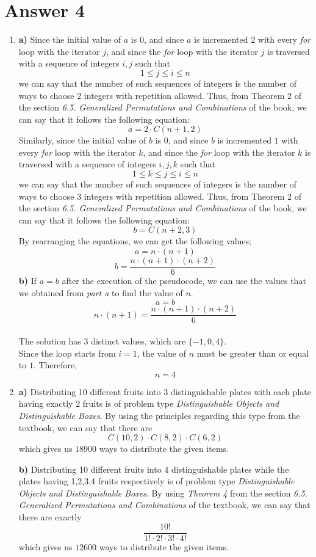 \documentclass[12pt]{article}
\begin{document}
\section*{Answer 4}
\begin{enumerate}
\item
\textbf{a)} Since the initial value of $a$ is $0$, and since $a$ is incremented $2$ with every \textit{for} loop with the iterator $j$, and since the \textit{for} loop with the iterator $j$ is traversed with a sequence of integers $i, j$ such that $$ 1 \leq j \leq i \leq n $$
we can say that the number of such sequences of integers is the number of ways to choose $2$ integers with repetition allowed. Thus, from Theorem 2 of the section \textit{6.5. Generalized Permutations and Combinations} of the book, we can say that it follows the following equation: $$a = 2 \cdot C(n+1,2)$$ 
Similarly, since the initial value of $b$ is $0$, and since $b$ is incremented $1$ with every \textit{for} loop with the iterator $k$, and since the \textit{for} loop with the iterator $k$ is traversed with a sequence of integers $i, j, k$ such that $$ 1 \leq k \leq j \leq i \leq n $$
we can say that the number of such sequences of integers is the number of ways to choose $3$ integers with repetition allowed. Thus, from Theorem 2 of the section \textit{6.5. Generalized Permutations and Combinations} of the book, we can say that it follows the following equation: $$b = C(n+2,3)$$ 
By rearranging the equations, we can get the following values;
$$ a = n \cdot (n+1) $$ $$ b = \dfrac{n \cdot (n+1) \cdot (n+2)}{6} $$ 
\textbf{b)} If $a=b$ after the execution of the pseudocode, we can use the values that we obtained from \textit{part a} to find the value of $n$. 
$$ a = b$$ 
$$n \cdot (n+1)  = \dfrac{n \cdot (n+1) \cdot (n+2)}{6} $$ \\
The solution has 3 distinct values, which are $\{-1,0,4\}$. \\
Since the loop starts from $i = 1$, the value of $n$ must be greater than or equal to $1$. Therefore, $$ n = 4 $$
\item 
\textbf{a)} Distributing 10 different fruits into 3 distinguishable plates with each plate having exactly 2 fruits is of problem type \textit{Distinguishable Objects and Distinguishable Boxes}. By using the principles regarding this type from the textbook, we can say that there are $$ C(10,2) \cdot C(8,2) \cdot C(6,2)$$ which gives us $18900$ ways to distribute the given items. 

\textbf{b)} Distributing 10 different fruits into 4 distinguishable plates while the plates having 1,2,3,4 fruits respectively is of problem type \textit{Distinguishable Objects and Distinguishable Boxes}. By using \textit{Theorem 4} from the section \textit{6.5. Generalized Permutations and Combinations} of the textbook, we can say that there are exactly $$ \dfrac{10!}{1! \cdot 2! \cdot 3! \cdot 4!}$$ which gives us $12600$ ways to distribute the given items. 


\end{enumerate}
\end{document}
